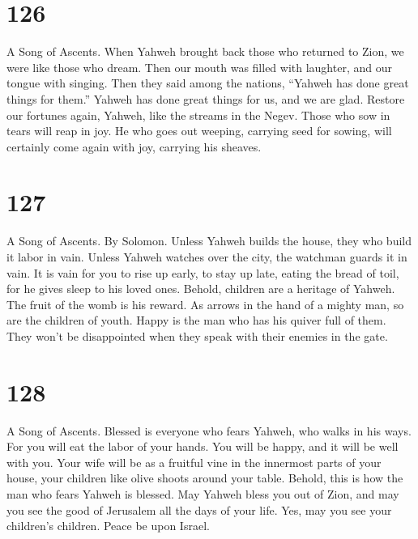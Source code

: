 \hypertarget{section-116}{%
\section{126}\label{section-116}}

A Song of Ascents.  When Yahweh brought back those who
returned to Zion, we were like those who dream.  Then our
mouth was filled with laughter, and our tongue with singing. Then they
said among the nations, ``Yahweh has done great things for them.''
 Yahweh has done great things for us, and we are glad.
 Restore our fortunes again, Yahweh, like the streams in the
Negev.  Those who sow in tears will reap in joy.
 He who goes out weeping, carrying seed for sowing, will
certainly come again with joy, carrying his sheaves.

\hypertarget{section-117}{%
\section{127}\label{section-117}}

A Song of Ascents. By Solomon.  Unless Yahweh builds the
house, they who build it labor in vain. Unless Yahweh watches over the
city, the watchman guards it in vain.  It is vain for you to
rise up early, to stay up late, eating the bread of toil, for he gives
sleep to his loved ones.  Behold, children are a heritage of
Yahweh. The fruit of the womb is his reward.  As arrows in
the hand of a mighty man, so are the children of youth. 
Happy is the man who has his quiver full of them. They won't be
disappointed when they speak with their enemies in the gate.

\hypertarget{section-118}{%
\section{128}\label{section-118}}

A Song of Ascents.  Blessed is everyone who fears Yahweh,
who walks in his ways.  For you will eat the labor of your
hands. You will be happy, and it will be well with you. 
Your wife will be as a fruitful vine in the innermost parts of your
house, your children like olive shoots around your table. 
Behold, this is how the man who fears Yahweh is blessed. 
May Yahweh bless you out of Zion, and may you see the good of Jerusalem
all the days of your life.  Yes, may you see your children's
children. Peace be upon Israel.


